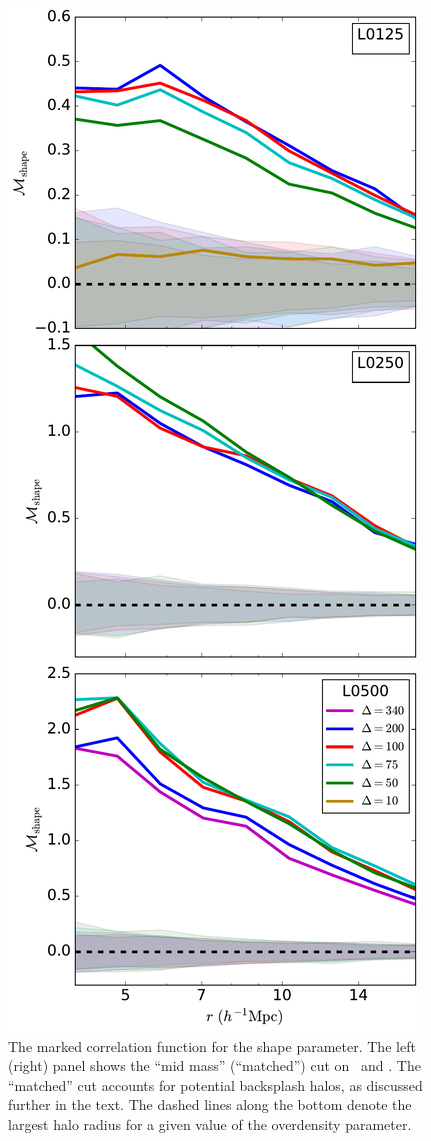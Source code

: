 \documentclass[usenatbib,usegraphicx,letterpaper]{mn2e}
\begin{document}
\begin{figure}
	\centering
	\includegraphics[width=.4\textwidth]{match_mcf_shape.pdf}
	\caption{The marked correlation function for the shape parameter. The left (right) panel shows the ``mid mass'' (``matched'') cut on \simA \ and \simB. The ``matched'' cut accounts for potential backsplash halos, as discussed further in the text. The dashed lines along the bottom denote the largest halo radius for a given value of the overdensity parameter.}
	\label{fig:hvm_mcf_s}
\end{figure}
\end{document}
